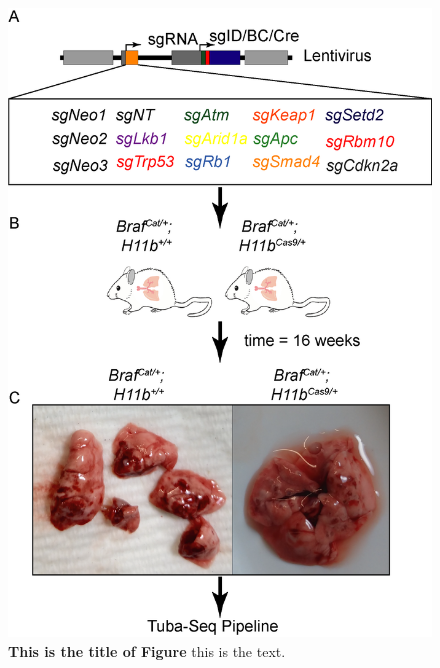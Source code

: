 \begin{figure}
\hypertarget{fig:04}{%
\centering
\includegraphics[width=1\textwidth,height=\textheight]{images/tuba1.png}
\caption{\textbf{This is the title of Figure} this is the text.}\label{fig:04}
}
\end{figure}

